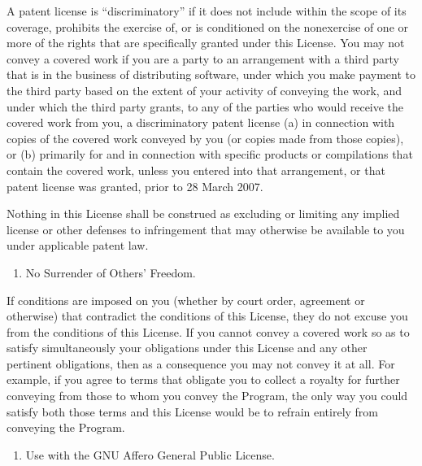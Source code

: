 \documentclass[letterpaper,10pt,english]{sphinxmanual}
\begin{document}
\sphinxAtStartPar
A patent license is “discriminatory” if it does not include within the scope of its coverage, prohibits the exercise of, or is conditioned on the non\sphinxhyphen{}exercise of one or more of the rights that are specifically granted under this License. You may not convey a covered work if you are a party to an arrangement with a third party that is in the business of distributing software, under which you make payment to the third party based on the extent of your activity of conveying the work, and under which the third party grants, to any of the parties who would receive the covered work from you, a discriminatory patent license (a) in connection with copies of the covered work conveyed by you (or copies made from those copies), or (b) primarily for and in connection with specific products or compilations that contain the covered work, unless you entered into that arrangement, or that patent license was granted, prior to 28 March 2007.

\sphinxAtStartPar
Nothing in this License shall be construed as excluding or limiting any implied license or other defenses to infringement that may otherwise be available to you under applicable patent law.
\begin{enumerate}
%
\setcounter{enumi}{11}
\item {} 
\sphinxAtStartPar
No Surrender of Others’ Freedom.

\end{enumerate}

\sphinxAtStartPar
If conditions are imposed on you (whether by court order, agreement or otherwise) that contradict the conditions of this License, they do not excuse you from the conditions of this License. If you cannot convey a covered work so as to satisfy simultaneously your obligations under this License and any other pertinent obligations, then as a consequence you may not convey it at all. For example, if you agree to terms that obligate you to collect a royalty for further conveying from those to whom you convey the Program, the only way you could satisfy both those terms and this License would be to refrain entirely from conveying the Program.
\begin{enumerate}
%
\setcounter{enumi}{12}
\item {} 
\sphinxAtStartPar
Use with the GNU Affero General Public License.

\end{enumerate}
\end{document}
